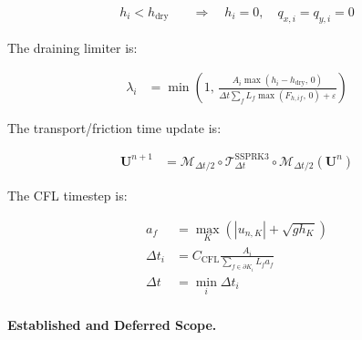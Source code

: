 \begin{align}
  h_i
  <
  h_{\mathrm{dry}}
  \quad
  &\Rightarrow
  \quad
  h_i=0,\quad
  q_{x,i}=q_{y,i}=0
  \label{eq:res-num-spec-regional-dry-reset}
\end{align}

The draining limiter is:

\begin{align}
  \lambda_i
  &=
  \min
  \left(
    1,\,
    \frac{
      A_i
      \max
      \left(
        h_i-h_{\mathrm{dry}},\,
        0
      \right)
    }{
      \Delta t
      \sum_f
      L_f
      \max
      \left(
        F_{h,if},\,
        0
      \right)
      +
      \varepsilon
    }
  \right)
  \label{eq:res-num-spec-regional-draining-limiter}
\end{align}

The transport/friction time update is:

\begin{align}
  \mathbf{U}^{n+1}
  &=
  \mathcal{M}_{\Delta t/2}
  \circ
  \mathcal{T}_{\Delta t}^{\mathrm{SSPRK3}}
  \circ
  \mathcal{M}_{\Delta t/2}
  \left(
    \mathbf{U}^{n}
  \right)
  \label{eq:res-num-spec-regional-strang-ssprk3}
\end{align}

The CFL timestep is:

\begin{align}
  a_f
  &=
  \max_K
  \left(
    \left|
      u_{n,K}
    \right|
    +
    \sqrt{g h_K}
  \right)
  \label{eq:res-num-spec-regional-face-signal-speed}
  \\
  \Delta t_i
  &=
  C_{\mathrm{CFL}}
  \frac{A_i}{
    \sum_{f\in\partial K_i}
    L_f a_f
  }
  \label{eq:res-num-spec-regional-cell-timestep}
  \\
  \Delta t
  &=
  \min_i
  \Delta t_i
  \label{eq:res-num-spec-regional-global-timestep}
\end{align}

\paragraph{Established and Deferred Scope.}
\label{sec:res-num-spec-regional-established-deferred}

